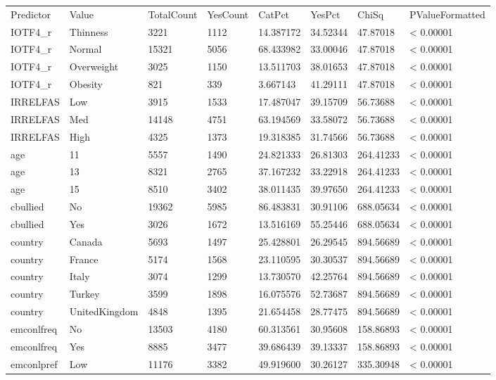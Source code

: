 \begin{table}
\centering
\begin{tabular}{llllllll}
Predictor & Value & TotalCount & YesCount & CatPct & YesPct & ChiSq & PValueFormatted \\
IOTF4_r & Thinness & 3221 & 1112 & 14.387172 & 34.52344 & 47.87018 & < 0.00001 \\
IOTF4_r & Normal & 15321 & 5056 & 68.433982 & 33.00046 & 47.87018 & < 0.00001 \\
IOTF4_r & Overweight & 3025 & 1150 & 13.511703 & 38.01653 & 47.87018 & < 0.00001 \\
IOTF4_r & Obesity & 821 & 339 & 3.667143 & 41.29111 & 47.87018 & < 0.00001 \\
IRRELFAS & Low & 3915 & 1533 & 17.487047 & 39.15709 & 56.73688 & < 0.00001 \\
IRRELFAS & Med & 14148 & 4751 & 63.194569 & 33.58072 & 56.73688 & < 0.00001 \\
IRRELFAS & High & 4325 & 1373 & 19.318385 & 31.74566 & 56.73688 & < 0.00001 \\
age & 11 & 5557 & 1490 & 24.821333 & 26.81303 & 264.41233 & < 0.00001 \\
age & 13 & 8321 & 2765 & 37.167232 & 33.22918 & 264.41233 & < 0.00001 \\
age & 15 & 8510 & 3402 & 38.011435 & 39.97650 & 264.41233 & < 0.00001 \\
cbullied & No & 19362 & 5985 & 86.483831 & 30.91106 & 688.05634 & < 0.00001 \\
cbullied & Yes & 3026 & 1672 & 13.516169 & 55.25446 & 688.05634 & < 0.00001 \\
country & Canada & 5693 & 1497 & 25.428801 & 26.29545 & 894.56689 & < 0.00001 \\
country & France & 5174 & 1568 & 23.110595 & 30.30537 & 894.56689 & < 0.00001 \\
country & Italy & 3074 & 1299 & 13.730570 & 42.25764 & 894.56689 & < 0.00001 \\
country & Turkey & 3599 & 1898 & 16.075576 & 52.73687 & 894.56689 & < 0.00001 \\
country & UnitedKingdom & 4848 & 1395 & 21.654458 & 28.77475 & 894.56689 & < 0.00001 \\
emconlfreq & No & 13503 & 4180 & 60.313561 & 30.95608 & 158.86893 & < 0.00001 \\
emconlfreq & Yes & 8885 & 3477 & 39.686439 & 39.13337 & 158.86893 & < 0.00001 \\
emconlpref & Low & 11176 & 3382 & 49.919600 & 30.26127 & 335.30948 & < 0.00001 \\

\end{tabular}
\end{table}

